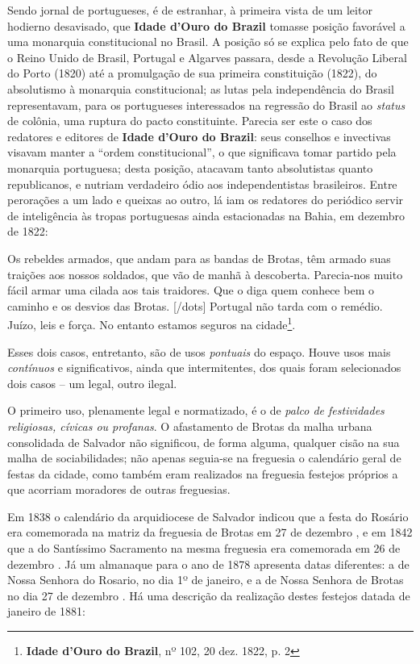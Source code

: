 Sendo jornal de portugueses, é de estranhar, à primeira vista de um leitor hodierno desavisado, que \textbf{Idade d'Ouro do Brazil} tomasse posição favorável a uma monarquia constitucional no Brasil. A posição só se explica pelo fato de que o Reino Unido de Brasil, Portugal e Algarves passara, desde a Revolução Liberal do Porto (1820) até a promulgação de sua primeira constituição (1822), do absolutismo à monarquia constitucional; as lutas pela independência do Brasil representavam, para os portugueses interessados na regressão do Brasil ao \textit{status} de colônia, uma ruptura do pacto constituinte. Parecia ser este o caso dos redatores e editores de \textbf{Idade d'Ouro do Brazil}: seus conselhos e invectivas visavam manter a ``ordem constitucional'', o que significava tomar partido pela monarquia portuguesa; desta posição, atacavam tanto absolutistas quanto republicanos, e nutriam verdadeiro ódio aos independentistas brasileiros. Entre perorações a um lado e queixas ao outro, lá iam os redatores do periódico servir de inteligência às tropas portuguesas ainda estacionadas na Bahia, em dezembro de 1822:

\begin{citacao}
Os rebeldes armados, que andam para as bandas de Brotas, têm armado suas traições aos nossos soldados, que vão de manhã à descoberta. Parecia-nos muito fácil armar uma cilada aos tais traidores. Que o diga quem conhece bem o caminho e os desvios das Brotas. [/dots] Portugal não tarda com o remédio. Juízo, leis e força. No entanto estamos seguros na cidade\footnote{\textbf{Idade d'Ouro do Brazil}, nº 102, 20 dez. 1822, p. 2}.
\end{citacao}

Esses dois casos, entretanto, são de usos \textit{pontuais} do espaço. Houve usos mais \textit{contínuos} e significativos, ainda que intermitentes, dos quais foram selecionados dois casos -- um legal, outro ilegal.

O primeiro uso, plenamente legal e normatizado, é o de \textit{palco de festividades religiosas, cívicas ou profanas}. O afastamento de Brotas da malha urbana consolidada de Salvador não significou, de forma alguma, qualquer cisão na sua malha de sociabilidades; não apenas seguia-se na freguesia o calendário geral de festas da cidade, como também eram realizados na freguesia festejos próprios a que acorriam moradores de outras freguesias.

Em 1838 o calendário da arquidiocese de Salvador indicou que a festa do Rosário era comemorada na matriz da freguesia de Brotas em 27 de dezembro \cite[p.~44]{arcebis_diario_1837}, e em 1842 que a do Santíssimo Sacramento na mesma freguesia era comemorada em 26 de dezembro \cite[p.~55]{arcebis_folhinha_1841}. Já um almanaque para o ano de 1878 apresenta datas diferentes: a de Nossa Senhora do Rosario, no dia 1º de janeiro, e a de Nossa Senhora de Brotas no dia 27 de dezembro \cite[pp.~53,~109]{macosta_almana_1877}. Há uma descrição da realização destes festejos datada de janeiro de 1881:

